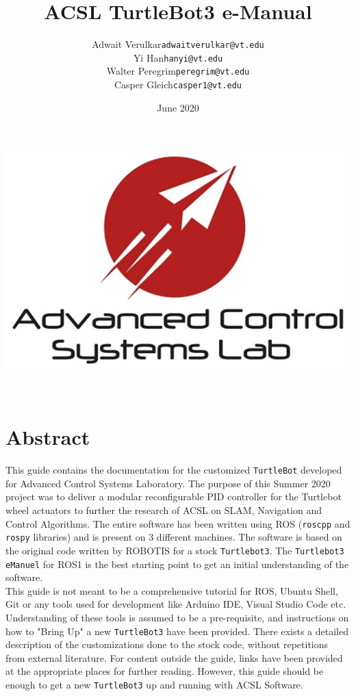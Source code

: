 \documentclass[12]{article}
\title{ACSL TurtleBot3 e-Manual}
\author{
\begin{tabular}{ccc}
Adwait Verulkar & \hspace{0.2in} &\texttt{adwaitverulkar@vt.edu}\\
Yi Han & \hspace{0.2in} &\texttt{hanyi@vt.edu}\\
Walter Peregrim & \hspace{0.2in} &\texttt{peregrim@vt.edu}\\
Casper Gleich & \hspace{0.2in} &\texttt{casper1@vt.edu}
\end{tabular}
}
\date{June 2020}
\begin{document}
\makeatletter
    \begin{titlepage}
        \begin{center}
            \includegraphics[width=0.7\linewidth]{images/ACSL_Logo.jpg}\\[4ex]
            {\huge \bfseries  \@title}\\[12ex] 
            {\large \@author}\\[52ex]  
            {\large \@date}
        \end{center}
    \end{titlepage}
\makeatother

\tableofcontents
\newpage
\section*{Abstract}
This guide contains the documentation for the customized \texttt{TurtleBot} developed for Advanced Control Systems Laboratory. The purpose of this Summer 2020 project was to deliver a modular reconfigurable PID controller for the Turtlebot wheel actuators to further the research of ACSL on SLAM, Navigation and Control Algorithms. The entire software has been written using ROS (\texttt{roscpp} and \texttt{rospy} libraries) and is present on 3 different machines. The software is based on the original code written by ROBOTIS for a stock \texttt{Turtlebot3}. The \texttt{Turtlebot3 eManuel} for ROS1 is the best starting point to get an initial understanding of the software.\\
This guide is not meant to be a comprehensive tutorial for ROS, Ubuntu Shell, Git or any tools used for development like Arduino IDE, Visual Studio Code etc. Understanding of these tools is assumed to be a pre-requisite, and instructions on how to "Bring Up" a new \texttt{TurtleBot3} have been provided. There exists a detailed description of the customizations done to the stock code, without repetitions from external literature. For content outside the guide, links have been provided at the appropriate places for further reading. However, this guide should be enough to get a new \texttt{TurtleBot3} up and running with ACSL Software.
\newpage
\end{document}
